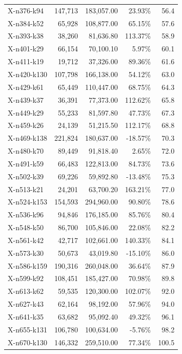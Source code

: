\documentclass[12pt,a4paper]{article}
\begin{document}
\begin{longtable}{@{}lrrrr@{}}
    X-n376-k94 & 147,713 & 183,057.00 & 23.93\% & 56.4 \\
    X-n384-k52 & 65,928 & 108,877.00 & 65.15\% & 57.6 \\
    X-n393-k38 & 38,260 & 81,636.80 & 113.37\% & 58.9 \\
    X-n401-k29 & 66,154 & 70,100.10 & 5.97\% & 60.1 \\
    X-n411-k19 & 19,712 & 37,326.00 & 89.36\% & 61.6 \\
    X-n420-k130 & 107,798 & 166,138.00 & 54.12\% & 63.0 \\
    X-n429-k61 & 65,449 & 110,447.00 & 68.75\% & 64.3 \\
    X-n439-k37 & 36,391 & 77,373.00 & 112.62\% & 65.8 \\
    X-n449-k29 & 55,233 & 81,597.80 & 47.73\% & 67.3 \\
    X-n459-k26 & 24,139 & 51,215.50 & 112.17\% & 68.8 \\
    X-n469-k138 & 221,824 & 180,637.00 & -18.57\% & 70.3 \\
    X-n480-k70 & 89,449 & 91,818.40 & 2.65\% & 72.0 \\
    X-n491-k59 & 66,483 & 122,813.00 & 84.73\% & 73.6 \\
    X-n502-k39 & 69,226 & 59,892.80 & -13.48\% & 75.3 \\
    X-n513-k21 & 24,201 & 63,700.20 & 163.21\% & 77.0 \\
    X-n524-k153 & 154,593 & 294,960.00 & 90.80\% & 78.6 \\
    X-n536-k96 & 94,846 & 176,185.00 & 85.76\% & 80.4 \\
    X-n548-k50 & 86,700 & 105,846.00 & 22.08\% & 82.2 \\
    X-n561-k42 & 42,717 & 102,661.00 & 140.33\% & 84.1 \\
    X-n573-k30 & 50,673 & 43,019.80 & -15.10\% & 86.0 \\
    X-n586-k159 & 190,316 & 260,048.00 & 36.64\% & 87.9 \\
    X-n599-k92 & 108,451 & 185,427.00 & 70.98\% & 89.8 \\
    X-n613-k62 & 59,535 & 120,300.00 & 102.07\% & 92.0 \\
    X-n627-k43 & 62,164 & 98,192.00 & 57.96\% & 94.0 \\
    X-n641-k35 & 63,682 & 95,092.40 & 49.32\% & 96.1 \\
    X-n655-k131 & 106,780 & 100,634.00 & -5.76\% & 98.2 \\
    X-n670-k130 & 146,332 & 259,510.00 & 77.34\% & 100.5 \\

\end{longtable}
\end{document}
